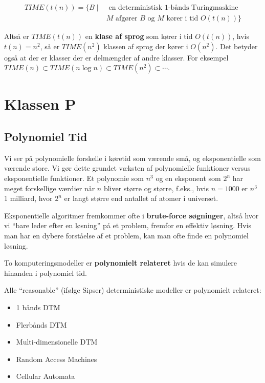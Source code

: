 \begin{definition}
	\begin{align*}
		TIME(t(n)) = \{B \mid & \text{ en deterministisk 1-bånds Turingmaskine }                  \\
		                      & M \text{ afgører } B \text{ og } M \text{ kører i tid } O(t(n))\}
	\end{align*}
\end{definition}

Altså er $TIME(t(n))$ en \textbf{klase af sprog} som kører i tid $O(t(n))$, hvis $t(n) = n^{2}$, så er $TIME(n^{2})$ klassen af sprog der kører i $O(n^{2})$. Det betyder også at der er klasser der er delmængder af andre klasser. For eksempel $TIME(n) \subset TIME(n \log n) \subset TIME(n^{2}) \subset \cdots$.


\section{Klassen P}%
\label{sec:p}

\subsection{Polynomiel Tid}%
\label{subsec:polynomialtime}

Vi ser på polynomielle forskelle i køretid som værende små, og eksponentielle som værende store. Vi gør dette grundet væksten af polynomielle funktioner versus eksponentielle funktioner. Et polynomie som $n^{3}$ og en eksponent som $2^{n}$ har meget forskellige værdier når $n$ bliver større og større, f.eks., hvis $n = 1000$ er $n^{3}$ 1 milliard, hvor $2^{n}$ er langt større end antallet af atomer i universet.

Eksponentielle algoritmer fremkommer ofte i \textbf{brute-force søgninger}, altså hvor vi ``bare leder efter en løsning'' på et problem, fremfor en effektiv løsning. Hvis man har en dybere forståelse af et problem, kan man ofte finde en polynomiel løsning.

\begin{definition}
	To komputeringsmodeller er \textbf{polynomielt relateret} hvis de kan simulere hinanden i polynomiel tid.
\end{definition}

Alle ``reasonable'' (ifølge Sipser) deterministiske modeller er polynomielt relateret:
\begin{itemize}
	\item 1 bånds DTM
	\item Flerbånds DTM
	\item Multi-dimensionelle DTM
	\item Random Access Machines
	\item Cellular Automata
\end{itemize}

